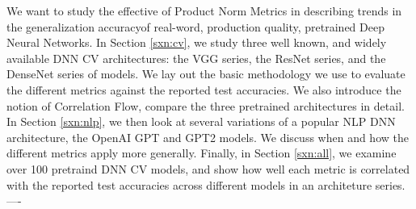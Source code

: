 We want to study the effective of Product Norm Metrics in describing trends in the
generalization accuracyof real-word, production quality, pretrained Deep Neural Networks.
In Section \ref{sxn:cv}, we study three well known, and widely available DNN CV architectures:
the VGG series, the ResNet series, and the DenseNet series of models.  We lay out the
basic methodology we use to evaluate the different metrics against the reported test accuracies. 
We also introduce the notion of Correlation Flow, compare the three pretrained architectures in detail.  
In Section  \ref{sxn:nlp}, we then look at several variations of a popular NLP DNN architecture,
the OpenAI GPT and GPT2 models.  We discuss when and how the different metrics apply more generally.
Finally, in Section \ref{sxn:all}, we examine over 100 pretraind DNN CV models, and show
how well each metric is correlated with the reported test accuracies across different models
in an architeture series.  
----








